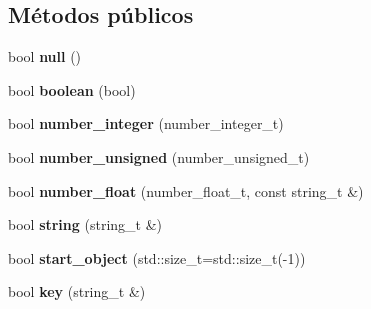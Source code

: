 \subsection*{Métodos públicos}
\begin{DoxyCompactItemize}
\item 
\mbox{\label{classnlohmann_1_1detail_1_1json__sax__acceptor_ad7ad55168af6e03ed8b844c94a17b9ce}} 
bool {\bfseries null} ()
\item 
\mbox{\label{classnlohmann_1_1detail_1_1json__sax__acceptor_a3f5fe42a9b195de8d251d6d98d5ee92c}} 
bool {\bfseries boolean} (bool)
\item 
\mbox{\label{classnlohmann_1_1detail_1_1json__sax__acceptor_a976bf4ce6e9a2ffe48f683ddff80af00}} 
bool {\bfseries number\+\_\+integer} (number\+\_\+integer\+\_\+t)
\item 
\mbox{\label{classnlohmann_1_1detail_1_1json__sax__acceptor_ad15b288f3351287edbe289502f595491}} 
bool {\bfseries number\+\_\+unsigned} (number\+\_\+unsigned\+\_\+t)
\item 
\mbox{\label{classnlohmann_1_1detail_1_1json__sax__acceptor_aebf8800023eb20d472f111f86b189e60}} 
bool {\bfseries number\+\_\+float} (number\+\_\+float\+\_\+t, const string\+\_\+t \&)
\item 
\mbox{\label{classnlohmann_1_1detail_1_1json__sax__acceptor_aaa69255e757a6ecc4403a2aa4931fc60}} 
bool {\bfseries string} (string\+\_\+t \&)
\item 
\mbox{\label{classnlohmann_1_1detail_1_1json__sax__acceptor_a822bbca11a9fea0aa337018e351755f5}} 
bool {\bfseries start\+\_\+object} (std\+::size\+\_\+t=std\+::size\+\_\+t(-\/1))
\item 
\mbox{\label{classnlohmann_1_1detail_1_1json__sax__acceptor_a59e1ea5e9c8d25346a564bf9287a5c2a}} 
bool {\bfseries key} (string\+\_\+t \&)

\end{DoxyCompactItemize}
